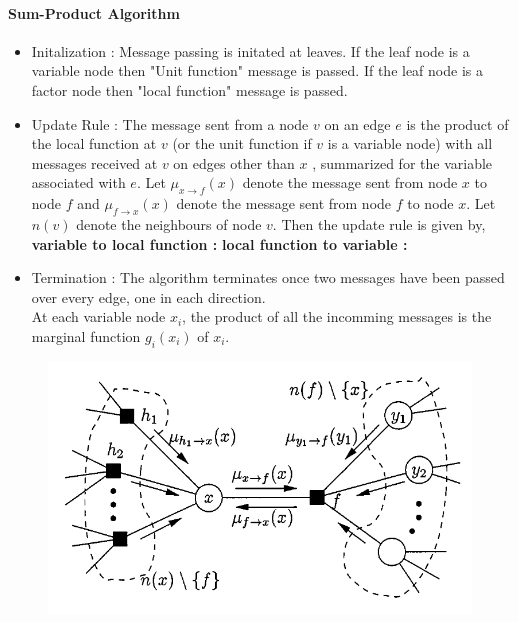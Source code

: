 \documentclass[letterpaper,english,10pt]{article}
\begin{document}
\paragraph{Sum-Product Algorithm}
\begin{itemize}
\renewcommand{\labelitemi}{$\Rightarrow$}
\item Initalization : Message passing is initated at leaves. If the leaf node is a variable node then "Unit function" message is passed. If the leaf node is a factor node then "local function" message is passed.
\item Update Rule : The message sent from a node $v$ on an edge $e$ is the product of the local function at $v$ (or the unit function if $v$ is 
a variable node) with all messages received at $v$ on edges other than $x$ , summarized for the variable associated with $e$.
Let $\mu_{x \to f}(x)$ denote the message sent from node $x$ to node $f$ and $\mu_{f \to x}(x)$ denote the message sent from node $f$ to node 
$x$. Let $n(v)$ denote the neighbours of node $v$. Then the update rule is given by,
\newline
\textbf{variable to local function : }
\textbf{local function to variable : }
\item Termination : The algorithm terminates once two messages have been passed over every edge, one in each direction.\\ At each variable node 
$x_i$, the product of all the incomming messages is the marginal function $g_i(x_i)$ of $x_i$.
\end{itemize}
\begin{figure}[htb]
\centering
\includegraphics[width=0.6\linewidth]{exmpl_7.png}
\end{figure}
\end{document}
